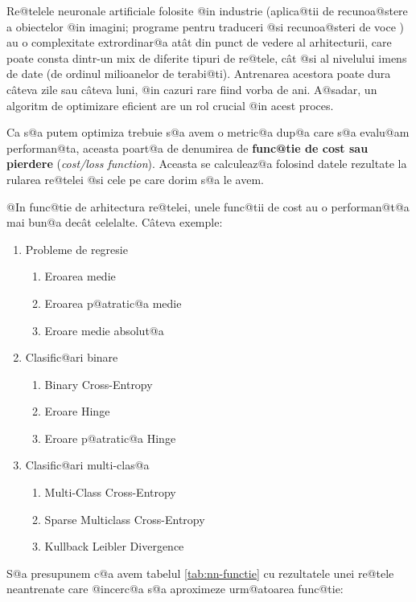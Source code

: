 Re@telele neuronale artificiale folosite @in industrie (aplica@tii de recunoa@stere a obiectelor @in imagini; programe pentru traduceri @si recunoa@steri de voce ) au o complexitate extrordinar@a at\^ at din punct de vedere al arhitecturii, care poate consta dintr-un mix de diferite tipuri de re@tele, c\^ at @si al nivelului imens de date (de ordinul milioanelor de terabi@ti). Antrenarea acestora poate dura c\^ ateva zile sau c\^ ateva luni, @in cazuri rare fiind vorba de ani. A@sadar, un algoritm de optimizare eficient are un rol crucial @in acest proces.

Ca s@a putem optimiza trebuie s@a avem o metric@a dup@a care s@a evalu@am performan@ta, aceasta poart@a de denumirea de \textbf{func@tie de cost sau pierdere} (\textsl{cost/loss function}). Aceasta se calculeaz@a folosind datele rezultate la rularea re@telei @si cele pe care dorim s@a le avem. 

@In func@tie de arhitectura re@telei, unele func@tii de cost au o performan@t@a mai bun@a dec\^ at celelalte. C\^ ateva exemple:

\begin{enumerate}
	\item Probleme de regresie
	\begin{enumerate}
		\item Eroarea medie
		\item Eroarea p@atratic@a medie
		\item Eroare medie absolut@a
	\end{enumerate}
	\item Clasific@ari binare
	\begin{enumerate}
		\item Binary Cross-Entropy
		\item Eroare Hinge
		\item Eroare p@atratic@a Hinge
	\end{enumerate}
	\item Clasific@ari multi-clas@a
	\begin{enumerate}
		\item Multi-Class Cross-Entropy
		\item Sparse Multiclass Cross-Entropy
		\item Kullback Leibler Divergence
	\end{enumerate}
\end{enumerate}

S@a presupunem c@a avem tabelul \ref{tab:nn-functie} cu rezultatele unei re@tele neantrenate care @incerc@a s@a aproximeze urm@atoarea func@tie:

